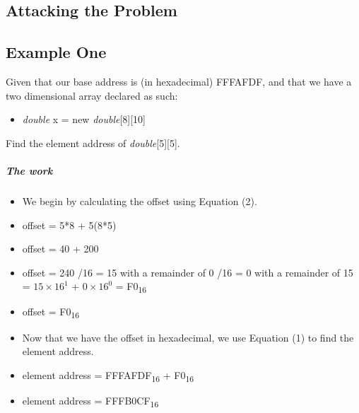 \documentclass[12pt]{article}
\begin{document}
\newpage %



\begin{center}
\section{Attacking the Problem}
\end{center}
\subsection{Example One}
Given that our base address is (in hexadecimal) FFFAFDF, and that we have a two dimensional array declared as such:
\begin{itemize}[leftmargin=1.5em]
\item[] \textit{double} x = new \textit{double}[8][10]
\end{itemize}
Find the element address of \textit{double}[5][5].
\subparagraph{The work}
\begin{itemize}[leftmargin=1.5em]
\item[] We begin by calculating the offset using Equation (2).
\item[] offset = 5*8 + 5(8*5)
\item[] offset = 40 + 200
\item[] offset = 240
/16 = 15 with a remainder of 0
/16 = 0 with a remainder of 15
 = $15\times16^1$ + $0\times16^0$
 = F0\textsubscript{16}
\item[] offset = F0\textsubscript{16}
\item[] Now that we have the offset in hexadecimal, we use Equation (1) to find the element address.
\item[] element address = FFFAFDF\textsubscript{16} + F0\textsubscript{16}
\item[] element address = FFFB0CF\textsubscript{16}
\end{itemize}
\end{document}

